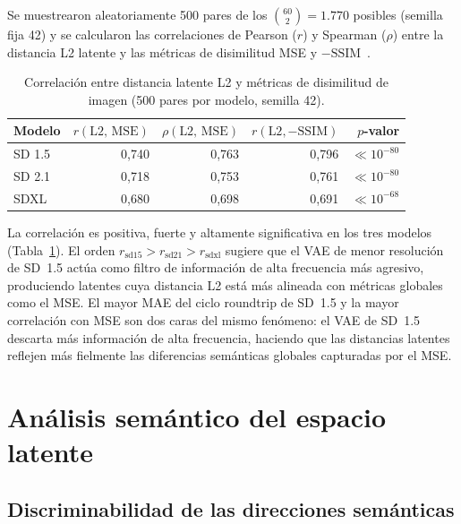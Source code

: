 \documentclass[12pt, a4paper, twoside]{book}
\begin{document}
Se muestrearon aleatoriamente 500 pares de los $\binom{60}{2} = 1.770$ posibles (semilla fija 42)
y se calcularon las correlaciones de Pearson ($r$) y Spearman ($\rho$) entre la distancia L2
latente y las métricas de disimilitud MSE y $-\text{SSIM}$~\citep{wang2004ssim}.

\begin{table}[htb]
\centering
\caption{Correlación entre distancia latente L2 y métricas de disimilitud de imagen
(500 pares por modelo, semilla 42).}
\label{tab:correlacion}
\small
\begin{tabular}{lrrrr}
\toprule
\textbf{Modelo} & $r(\text{L2, MSE})$ & $\rho(\text{L2, MSE})$ &
$r(\text{L2}, -\text{SSIM})$ & \textbf{$p$-valor} \\
\midrule
SD 1.5 & 0,740 & 0,763 & 0,796 & $\ll 10^{-80}$ \\
SD 2.1 & 0,718 & 0,753 & 0,761 & $\ll 10^{-80}$ \\
SDXL   & 0,680 & 0,698 & 0,691 & $\ll 10^{-68}$ \\
\bottomrule
\end{tabular}
\end{table}

La correlación es positiva, fuerte y altamente significativa en los tres modelos
(Tabla~\ref{tab:correlacion}). El orden $r_{\text{sd15}} > r_{\text{sd21}} > r_{\text{sdxl}}$
sugiere que el VAE de menor resolución de SD~1.5 actúa como filtro de información de alta
frecuencia más agresivo, produciendo latentes cuya distancia L2 está más alineada con
métricas globales como el MSE. El mayor MAE del ciclo roundtrip de SD~1.5 y la mayor
correlación con MSE son dos caras del mismo fenómeno: el VAE de SD~1.5 descarta más
información de alta frecuencia, haciendo que las distancias latentes reflejen más fielmente
las diferencias semánticas globales capturadas por el MSE.

\section{Análisis semántico del espacio latente}
\label{sec:res:semantico}

\subsection{Discriminabilidad de las direcciones semánticas}
\label{subsec:res:discriminabilidad}
\end{document}
